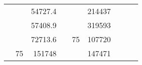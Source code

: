 \begin{table}[H]
\begin{tabular}{|ccrccrccc}
\multicolumn{1}{|c|}{\cellcolor[HTML]{FFFFC7}}                                & \multicolumn{1}{c|}{\cellcolor[HTML]{DAE8FC}}                      & \multicolumn{1}{r|}{\cellcolor[HTML]{DAE8FC}54727.4}   & \multicolumn{1}{c|}{\cellcolor[HTML]{FFFFC7}}                                & \multicolumn{1}{c|}{\cellcolor[HTML]{DAE8FC}}                       & \multicolumn{1}{r|}{\cellcolor[HTML]{DDFDFF}214437}    &                                                                              &                                                                    &                                                        \\ \cline{3-3} \cline{6-6}
\multicolumn{1}{|c|}{\cellcolor[HTML]{FFFFC7}}                                & \multicolumn{1}{c|}{\cellcolor[HTML]{DAE8FC}}                      & \multicolumn{1}{r|}{\cellcolor[HTML]{DDFDFF}57408.9}   & \multicolumn{1}{c|}{\cellcolor[HTML]{FFFFC7}}                                & \multicolumn{1}{c|}{\cellcolor[HTML]{DAE8FC}}                       & \multicolumn{1}{r|}{\cellcolor[HTML]{DAE8FC}319593}    &                                                                              &                                                                    &                                                        \\ \cline{3-3} \cline{6-6}
\multicolumn{1}{|c|}{\cellcolor[HTML]{FFFFC7}}                                & \multicolumn{1}{c|}{\cellcolor[HTML]{DAE8FC}}                      & \multicolumn{1}{r|}{\cellcolor[HTML]{DAE8FC}72713.6}   & \multicolumn{1}{c|}{\cellcolor[HTML]{FFFFC7}}                                & \multicolumn{1}{c|}{\multirow{-10}{*}{\cellcolor[HTML]{DAE8FC}75}}  & \multicolumn{1}{r|}{\cellcolor[HTML]{DDFDFF}107720}    &                                                                              &                                                                    &                                                        \\ \cline{3-3} \cline{5-6}
\multicolumn{1}{|c|}{\cellcolor[HTML]{FFFFC7}}                                & \multicolumn{1}{c|}{\multirow{-10}{*}{\cellcolor[HTML]{DAE8FC}75}} & \multicolumn{1}{r|}{\cellcolor[HTML]{DDFDFF}151748}    & \multicolumn{1}{c|}{\cellcolor[HTML]{FFFFC7}}                                & \multicolumn{1}{c|}{\cellcolor[HTML]{DDFDFF}}                       & \multicolumn{1}{r|}{\cellcolor[HTML]{DAE8FC}147471}    &                                                                              &                                                                    &                                                        \\ \cline{2-3} \cline{6-6}

\end{tabular}
\end{table}
